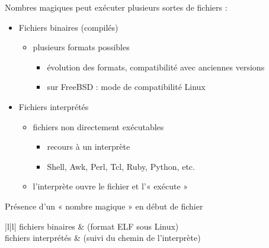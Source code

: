 \begin {frame} {Nombres magiques}
     peut exécuter plusieurs sortes de fichiers :

    \begin {itemize}
	\item Fichiers binaires (compilés)
	    \begin {itemize}
		\item plusieurs formats possibles
		    \begin {itemize}
			\item évolution des formats,
			    compatibilité avec anciennes versions
			\item sur FreeBSD : mode de compatibilité Linux
		    \end {itemize}
	    \end {itemize}
	\item Fichiers interprétés
	    \begin {itemize}
		\item fichiers non directement exécutables
		    \begin {itemize}
			\item recours à un interprète
			\item Shell, Awk, Perl, Tcl, Ruby, Python, etc.
		    \end {itemize}
		\item l'interprète ouvre le fichier et l'« exécute »
	    \end {itemize}
    \end {itemize}

    \vspace* {1mm}

    Présence d'un « nombre magique » en début de fichier

    \ctableau {\fC} {|l|l|} {
	fichiers binaires
	    &  (format ELF sous Linux) \\
	fichiers interprétés
	    &   (suivi du chemin de l'interprète) \\
    }

\end {frame}



